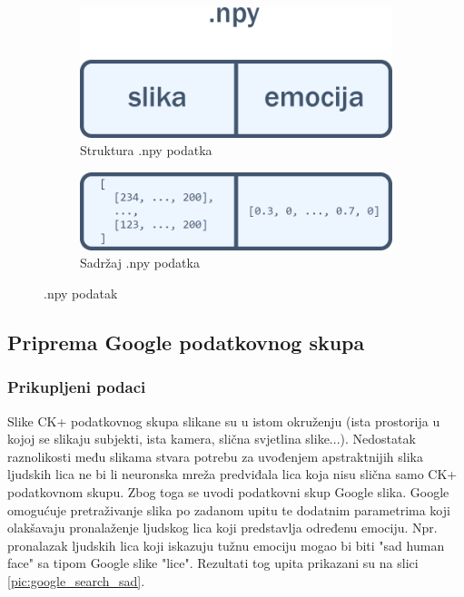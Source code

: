 \documentclass[times, utf8, zavrsni,numeric]{fer}
\begin{document}
\begin{figure}[H]\label{fig:npy_array}
	\begin{subfigure}[b]{0.5\linewidth}
	  	\centering
		\includegraphics[width=\linewidth]{numpy_slika_emocija.png}
		\caption{Struktura .npy podatka}		
	\end{subfigure}
	\begin{subfigure}[b]{0.5\linewidth}
	  	\centering
		\includegraphics[width=\linewidth]{numpy_imgdata_emo.png}
		\caption{Sadržaj .npy podatka}
	\end{subfigure}	
	\caption{.npy podatak}	
\end{figure}


\subsection{Priprema Google podatkovnog skupa}
\subsubsection{Prikupljeni podaci}
Slike CK+ podatkovnog skupa slikane su u istom okruženju (ista prostorija u kojoj se slikaju subjekti, ista kamera, slična svjetlina slike...). Nedostatak raznolikosti među slikama stvara potrebu za uvođenjem apstraktnijih slika ljudskih lica ne bi li neuronska mreža predviđala lica koja nisu slična samo CK+ podatkovnom skupu. Zbog toga se uvodi podatkovni skup Google slika. Google omogućuje pretraživanje slika po zadanom upitu te dodatnim parametrima koji olakšavaju pronalaženje ljudskog lica koji predstavlja određenu emociju. Npr. pronalazak ljudskih lica koji iskazuju tužnu emociju mogao bi biti "sad human face" sa tipom Google slike "lice". Rezultati tog upita prikazani su na slici \ref{pic:google_search_sad}.
\end{document}
